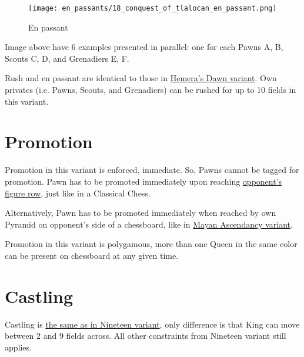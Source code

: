 \vspace*{-1.4\baselineskip}
\noindent
\begin{figure}[!h]
\texttt{[image: en\_passants/18\_conquest\_of\_tlalocan\_en\_passant.png]}
\vspace*{-1.3\baselineskip}
\caption{En passant}
\label{fig:18_conquest_of_tlalocan_en_passant}
\end{figure}

\vspace*{-0.5\baselineskip}
Image above have 6 examples presented in parallel: one for each Pawns A, B,
Scouts C, D, and Grenadiers E, F.

Rush and en passant are identical to those in
\hyperref[fig:14_hemera_s_dawn_en_passant]{Hemera's Dawn variant}.
Own privates (i.e. Pawns, Scouts, and Grenadiers) can be rushed for up to 10
fields in this variant.

\clearpage %

\section*{Promotion}
\label{sec:Conquest of Tlalocan/Promotion}

Promotion in this variant is enforced, immediate. So, Pawns cannot be tagged
for promotion. Pawn has to be promoted immediately upon reaching
\hyperref[sec:Terms/Figure row]{opponent's figure row},
just like in a Classical Chess.

Alternatively, Pawn has to be promoted immediately when reached by own Pyramid
on opponent's side of a chessboard, like in
\hyperref[sec:Mayan Ascendancy/Pyramid/Promotion]{Mayan Ascendancy variant}.

Promotion in this variant is polygamous, more than one Queen in the same color
can be present on chessboard at any given time.

\clearpage %

\section*{Castling}
\label{sec:Conquest of Tlalocan/Castling}

Castling is
\hyperref[sec:Nineteen/Castling]{the same as in Nineteen variant},
only difference is that King can move
between 2 and 9 fields across. All other constraints from Nineteen variant still
applies.

